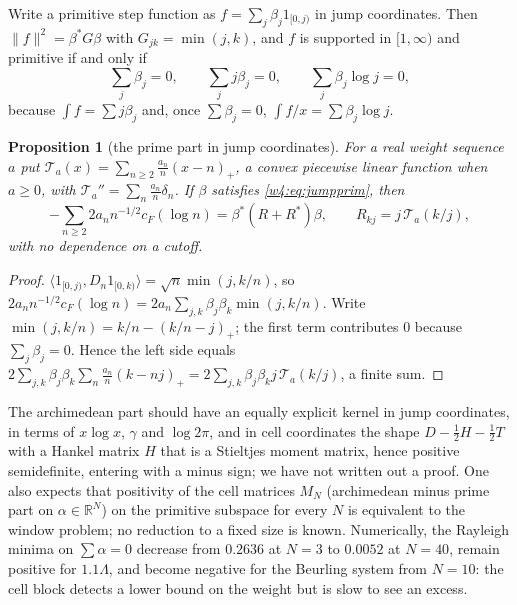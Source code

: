 \documentclass[11pt]{amsart}
\newtheorem{proposition}[theorem]{Proposition}
\theoremstyle{definition}
\theoremstyle{remark}
\numberwithin{equation}{section}
\newcommand{\R}{\mathbb{R}}
\newcommand{\cF}{c_F}                                  %
\begin{document}
Write a primitive step function as $f=\sum_j\beta_j1_{[0,j)}$ in jump coordinates. Then $\|f\|^2=\beta^*G\beta$ with $G_{jk}=\min(j,k)$, and
$f$ is supported in $[1,\infty)$ and primitive if and only if
\begin{equation}\label{w4:eq:jumpprim}
\textstyle\sum_j\beta_j=0,\qquad\sum_jj\beta_j=0,\qquad\sum_j\beta_j\log j=0,
\end{equation}
because $\int f=\sum j\beta_j$ and, once $\sum\beta_j=0$, $\int f/x=\sum\beta_j\log j$.

\begin{proposition}[the prime part in jump coordinates]\label{w4:prop:jump}
For a real weight sequence $a$ put $\mathcal T_a(x)=\sum_{n\ge2}\frac{a_n}n(x-n)_+$, a convex piecewise linear function when $a\ge0$, with
$\mathcal T_a''=\sum_n\frac{a_n}n\delta_n$. If $\beta$ satisfies \eqref{w4:eq:jumpprim}, then
\[
-\sum_{n\ge2}2a_nn^{-1/2}\cF(\log n)=\beta^*(R+R^*)\beta,\qquad R_{kj}=j\,\mathcal T_a(k/j),
\]
with no dependence on a cutoff.
\end{proposition}

\begin{proof}
$\langle1_{[0,j)},D_n1_{[0,k)}\rangle=\sqrt n\min(j,k/n)$, so $2a_nn^{-1/2}\cF(\log n)=2a_n\sum_{j,k}\beta_j\beta_k\min(j,k/n)$. Write
$\min(j,k/n)=k/n-(k/n-j)_+$; the first term contributes $0$ because $\sum_j\beta_j=0$. Hence the left side equals
$2\sum_{j,k}\beta_j\beta_k\sum_n\frac{a_n}n(k-nj)_+=2\sum_{j,k}\beta_j\beta_kj\,\mathcal T_a(k/j)$, a finite sum.
\end{proof}

The archimedean part should have an equally explicit kernel in jump coordinates, in terms of $x\log x$, $\gamma$ and
$\log2\pi$, and in cell coordinates the shape $D-\frac12H-\frac12T$ with a Hankel matrix $H$ that is a Stieltjes moment
matrix, hence positive semidefinite, entering with a minus sign; we have not written out a proof. One also expects that
positivity of the cell matrices $M_N$ (archimedean minus prime part on $\alpha\in\R^N$) on the primitive subspace for
every $N$ is equivalent to the window problem; no reduction to a fixed size is known. Numerically, the Rayleigh minima on
$\sum\alpha=0$ decrease from $0.2636$ at $N=3$ to $0.0052$ at $N=40$, remain positive for $1.1\Lambda$, and become
negative for the Beurling system from $N=10$: the cell block detects a lower bound on the weight but is slow to see an
excess.
\end{document}
